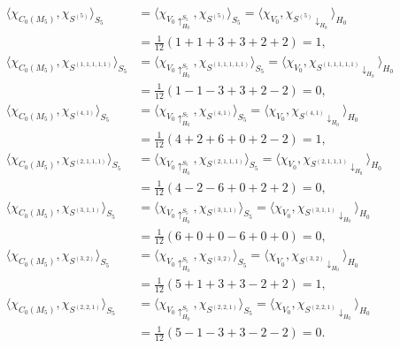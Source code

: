 \documentclass[12pt]{book}
\theoremstyle{definition}
\newcounter{in}
\begin{document}
  \begin{align*}
    \langle\chi_{C_{0}(M_{5})},\chi_{S^{(5)}}\rangle_{S_{5}}&=\langle\chi_{V_{0}\uparrow^{S_{5}}_{H_0}},\chi_{S^{(5)}}\rangle_{S_{5}}=\langle\chi_{V_{0}},\chi_{S^{(5)}\downarrow_{H_{0}}}\rangle_{H_{0}}\\ 
    &=\frac{1}{12}(1+1+3+3+2+2)=1,\\ 
    \langle\chi_{C_{0}(M_{5})},\chi_{S^{(1,1,1,1,1)}}\rangle_{S_{5}}&=\langle\chi_{V_{0}\uparrow^{S_{5}}_{H_0}},\chi_{S^{(1,1,1,1,1)}}\rangle_{S_{5}}=\langle\chi_{V_{0}},\chi_{S^{(1,1,1,1,1)}\downarrow_{H_{0}}}\rangle_{H_{0}}\\
    &=\frac{1}{12}(1-1-3+3+2-2)=0, \\
    \langle\chi_{C_{0}(M_{5})},\chi_{S^{(4,1)}}\rangle_{S_{5}}&=\langle\chi_{V_{0}\uparrow^{S_{5}}_{H_0}},\chi_{S^{(4,1)}}\rangle_{S_{5}}=\langle\chi_{V_{0}},\chi_{S^{(4,1)}\downarrow_{H_{0}}}\rangle_{H_{0}}\\
    &=\frac{1}{12}(4+2+6+0+2-2)=1, \\
    \langle\chi_{C_{0}(M_{5})},\chi_{S^{(2,1,1,1)}}\rangle_{S_{5}}&=\langle\chi_{V_{0}\uparrow^{S_{5}}_{H_0}},\chi_{S^{(2,1,1,1)}}\rangle_{S_{5}}=\langle\chi_{V_{0}},\chi_{S^{(2,1,1,1)}\downarrow_{H_{0}}}\rangle_{H_{0}}\\
    &=\frac{1}{12}(4-2-6+0+2+2)=0, \\
    \langle\chi_{C_{0}(M_{5})},\chi_{S^{(3,1,1)}}\rangle_{S_{5}}&=\langle\chi_{V_{0}\uparrow^{S_{5}}_{H_0}},\chi_{S^{(3,1,1)}}\rangle_{S_{5}}=\langle\chi_{V_{0}},\chi_{S^{(3,1,1)}\downarrow_{H_{0}}}\rangle_{H_{0}}\\
    &=\frac{1}{12}(6+0+0-6+0+0)=0, \\
    \langle\chi_{C_{0}(M_{5})},\chi_{S^{(3,2)}}\rangle_{S_{5}}&=\langle\chi_{V_{0}\uparrow^{S_{5}}_{H_0}},\chi_{S^{(3,2)}}\rangle_{S_{5}}=\langle\chi_{V_{0}},\chi_{S^{(3,2)}\downarrow_{H_{0}}}\rangle_{H_{0}}\\
    &=\frac{1}{12}(5+1+3+3-2+2)=1, \\
    \langle\chi_{C_{0}(M_{5})},\chi_{S^{(2,2,1)}}\rangle_{S_{5}}&=\langle\chi_{V_{0}\uparrow^{S_{5}}_{H_0}},\chi_{S^{(2,2,1)}}\rangle_{S_{5}}=\langle\chi_{V_{0}},\chi_{S^{(2,2,1)}\downarrow_{H_{0}}}\rangle_{H_{0}}\\
    &=\frac{1}{12}(5-1-3+3-2-2)=0. 
  \end{align*}
\end{document}
